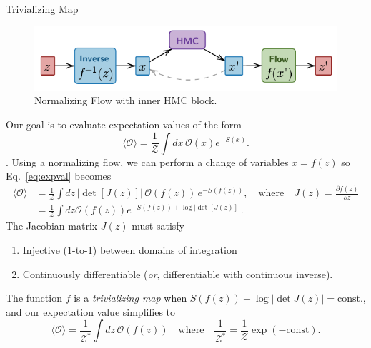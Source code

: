 \documentclass[final]{beamer}
\newlength{\colwidth}
\begin{document}
\begin{frame}[t]
\begin{columns}[t]
\begin{column}{\colwidth}
  \begin{block}{Trivializing Map}
    \begin{figure}
      \centering
      \includegraphics[width=\columnwidth]{assets/ftHMC}
      \caption{\label{fig:ftHMC}Normalizing Flow with inner HMC block.}
    \end{figure}
    Our goal is to evaluate expectation values of the form
    \begin{equation}
      \langle \mathcal{O}\rangle = \frac{1}{\mathcal{Z}}\int dx \,\mathcal{O}(x) e^{-S(x)}.
      \label{eq:expval}
    \end{equation}.
    Using a normalizing flow, we can perform a change of variables \(x = f(z)\) so Eq.~\ref{eq:expval} becomes 
    \begin{align}
      \langle \mathcal{O}\rangle 
        &= \frac{1}{\mathcal{Z}}\int dz\, |\det[J(z)]|\, \mathcal{O}(f(z))\,
        e^{-S(f(z))}, \quad\text{where}\quad J(z) = \frac{\partial f(z)}{\partial z} \\
        &= \frac{1}{\mathcal{Z}}\int dz \mathcal{O}(f(z)) e^{-S(f(z)) + \log|\det[J(z)]|}.
      \label{eq:expval_modified}
    \end{align}
    The Jacobian matrix \(J(z)\) must satisfy
    \begin{enumerate}
      \item Injective (1-to-1) between domains of integration
      \item Continuously differentiable (\emph{or}, differentiable with continuous inverse).
    \end{enumerate}
    The function \(f\) is a \emph{trivializing map} when \(S(f(z)) - \log|\det J(z)| = \text{const.}\), and our
    expectation value simplifies to 
    \begin{equation}
      \langle \mathcal{O}\rangle = \frac{1}{\mathcal{Z^{*}}}\int dz\, \mathcal{O}(f(z))\quad\text{where}\quad
      \frac{1}{\mathcal{Z^{*}}} = \frac{1}{\mathcal{Z}}\exp(-\mathrm{const}).
    \end{equation}

\end{block}
\end{column}
\end{columns}
\end{frame}
\end{document}
